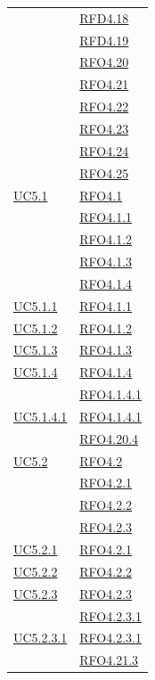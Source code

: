 \begin{itemize}
\begin{itemize}
\begin{itemize}
\begin{itemize}
\begin{longtable}{|>{\centering}m{5cm}|m{5cm}<{\centering}|}
& \hyperlink{RFD4.18}{RFD4.18}\\
& \hyperlink{RFD4.18}{RFD4.19}\\
& \hyperlink{RFD4.18}{RFO4.20}\\
& \hyperlink{RFD4.18}{RFO4.21}\\
& \hyperlink{RFD4.18}{RFO4.22}\\
& \hyperlink{RFD4.18}{RFO4.23}\\
& \hyperlink{RFD4.18}{RFO4.24}\\
& \hyperlink{RFD4.18}{RFO4.25}\\ \hline
\hyperref[UC5.1]{UC5.1} & \hyperlink{RFO4.1}{RFO4.1}\\
& \hyperlink{RFO4.1.1}{RFO4.1.1}\\
& \hyperlink{RFO4.1.2}{RFO4.1.2}\\
& \hyperlink{RFO4.1.3}{RFO4.1.3}\\
& \hyperlink{RFO4.1.4}{RFO4.1.4}\\ \hline
\hyperref[UC5.1.1]{UC5.1.1} & \hyperlink{RFO4.1.1}{RFO4.1.1}\\ \hline
\hyperref[UC5.1.2]{UC5.1.2} & \hyperlink{RFO4.1.2}{RFO4.1.2}\\ \hline
\hyperref[UC5.1.3]{UC5.1.3} & \hyperlink{RFO4.1.3}{RFO4.1.3}\\ \hline
\hyperref[UC5.1.4]{UC5.1.4} & \hyperlink{RFO4.1.4}{RFO4.1.4}\\
& \hyperlink{RFO4.1.4.1}{RFO4.1.4.1}\\ \hline
\hyperref[UC5.1.4.1]{UC5.1.4.1} & \hyperlink{RFO4.1.4.1}{RFO4.1.4.1}\\ & \hyperlink{RFO4.20.4}{RFO4.20.4}\\ \hline

\hyperref[UC5.2]{UC5.2} & \hyperlink{RFO4.2}{RFO4.2}\\
& \hyperlink{RFO4.2.1}{RFO4.2.1}\\
& \hyperlink{RFO4.2.2}{RFO4.2.2}\\
& \hyperlink{RFO4.2.3}{RFO4.2.3}\\ \hline

\hyperref[UC5.2.1]{UC5.2.1} & \hyperlink{RFO4.2.1}{RFO4.2.1}\\ \hline
\hyperref[UC5.2.2]{UC5.2.2} & \hyperlink{RFO4.2.2}{RFO4.2.2}\\ \hline
\hyperref[UC5.2.3]{UC5.2.3} & \hyperlink{RFO4.2.3}{RFO4.2.3}\\
& \hyperlink{RFO4.2.3.1}{RFO4.2.3.1}\\ \hline
\hyperref[UC5.2.3.1]{UC5.2.3.1} & \hyperlink{RFO4.2.3.1}{RFO4.2.3.1}\\ & \hyperlink{RFO4.21.3}{RFO4.21.3}\\ \hline


\end{longtable}
\end{itemize}
\end{itemize}
\end{itemize}
\end{itemize}
